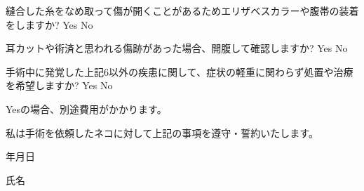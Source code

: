 \documentclass{jsarticle}
\begin{document}
\noindent {}縫合した糸をなめ取って傷が開くことがあるためエリザベスカラーや腹帯の装着をしますか?  Yes  No

\noindent {}耳カットや術済と思われる傷跡があった場合、開腹して確認しますか?  Yes  No

\noindent {}手術中に発覚した上記6以外の疾患に関して、症状の軽重に関わらず処置や治療を希望しますか?  Yes  No


\textreferencemark Yesの場合、別途費用がかかります。

\vspace{20pt}
\Large
私は手術を依頼したネコに対して上記の事項を遵守・誓約いたします。

\large
\vspace{20pt}
\begin{flushright}
年\hspace{40pt}月\hspace{40pt}日

\vspace{20pt}
氏名\underline{\hspace{205pt}}
\end{flushright}
\end{document}
